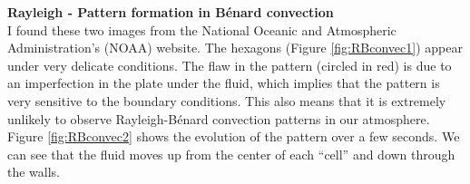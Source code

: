 \documentclass[11pt]{article}
\begin{document}
\noindent \textbf{Rayleigh - Pattern formation in B\'{e}nard convection}\\

I found these two images from the National Oceanic and Atmospheric Administration's (NOAA) website. The hexagons (Figure \ref{fig:RBconvec1}) appear under very delicate conditions. The flaw in the pattern (circled in red) is due to an imperfection in the plate under the fluid, which implies that the pattern is very sensitive to the boundary conditions. This also means that it is extremely unlikely to observe Rayleigh-B\'{e}nard convection patterns in our atmosphere. Figure \ref{fig:RBconvec2} shows the evolution of the pattern over a few seconds. We can see that the fluid moves up from the center of each ``cell'' and down through the walls. \\
\end{document}
